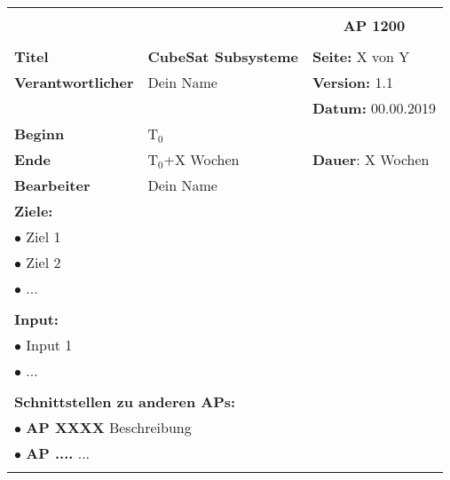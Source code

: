 \clearpage
\begin{table}[!h]
 \begin{center}
  \begin{tabular}{|p{35mm}||p{55mm}|p{50mm}||p{40mm}|}
   \hline
   \multicolumn{3}{|l||}{\textbf{}} & \multicolumn{1}{c|}{}\\
   \multicolumn{3}{|l||}{\textbf{}} & \multicolumn{1}{c|}{\textbf{AP 1200}}\\
   \multicolumn{3}{|l||}{\textbf{}} & \multicolumn{1}{c|}{}\\
   \hline\hline
   \textbf{Titel} & \multicolumn{2}{p{7cm}||}{\textbf{CubeSat Subsysteme}} & \textbf{Seite:} X von Y\\
   \hline
   \textbf{Verantwortlicher} & \multicolumn{2}{l||}{Dein Name} & \textbf{Version:} 1.1\\
   \hline
   \multicolumn{3}{|l||}{} & \textbf{Datum:} 00.00.2019\\
   \hline\hline
   \textbf{Beginn} & \multicolumn{2}{l||}{T$_0$} & \\
   \hline
   \textbf{Ende} & \multicolumn{2}{l||}{T$_0$+X Wochen} & \textbf{Dauer}: X Wochen\\
   \hline\hline
   \textbf{Bearbeiter} & \multicolumn{3}{l|}{Dein Name}\\
   \hline\hline
   \multicolumn{4}{|p{150mm}|}{\textbf{Ziele:}}\\
   \multicolumn{4}{|p{150mm}|}{$\bullet$ Ziel 1}\\
   \multicolumn{4}{|p{150mm}|}{$\bullet$ Ziel 2}\\
   \multicolumn{4}{|p{150mm}|}{$\bullet$ ...}\\
   \multicolumn{4}{|p{150mm}|}{}\\
   \multicolumn{4}{|p{150mm}|}{\textbf{Input:}}\\
   \multicolumn{4}{|p{150mm}|}{$\bullet$ Input 1}\\
   \multicolumn{4}{|p{150mm}|}{$\bullet$ ...}\\
   \multicolumn{4}{|p{150mm}|}{}\\
   \multicolumn{4}{|p{150mm}|}{\textbf{Schnittstellen zu anderen APs:}}\\
   \multicolumn{4}{|p{150mm}|}{$\bullet$ \textbf{AP XXXX} Beschreibung}\\
   \multicolumn{4}{|p{150mm}|}{$\bullet$ \textbf{AP ....} ...}\\
   \multicolumn{4}{|p{150mm}|}{}\\

\end{tabular}
\end{center}
\end{table}
